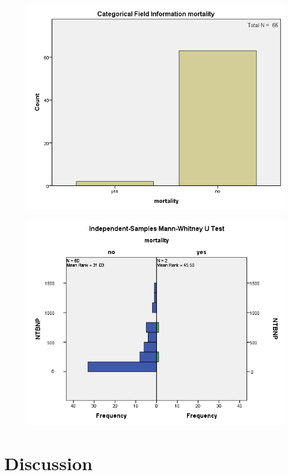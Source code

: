 \documentclass[14pt,a4paper,onecolumn]{extarticle}
\begin{document}
\clearpage
\begin{figure}
    \centering
    \includegraphics[scale=0.7]{../images/cat_mort.png}
    \small\caption{}
    \label{}
\end{figure}

\clearpage
\begin{figure}
    \centering
    \includegraphics[scale=0.7]{../images/manwhit_mort.png}
    \small\caption{}
    \label{}
\end{figure}

\clearpage
\section{Discussion}
\end{document}
